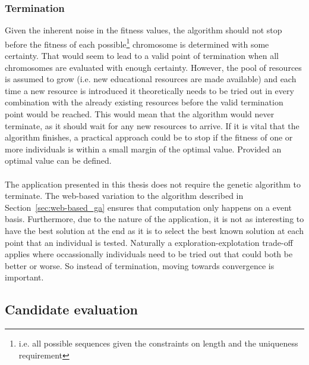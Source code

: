 \subsubsection{Termination}
\label{sec:approach_termination}
Given the inherent noise in the fitness values, the algorithm should not stop
before the fitness of each possible\footnote{i.e. all possible sequences given
the constraints on length and the uniqueness requirement} chromosome is determined
with some certainty. That would seem to lead to a valid point of termination
when all chromosomes are evaluated with enough certainty. However,
the pool of resources is assumed to grow (i.e. new educational resources are made
available) and each time a new resource is introduced it theoretically needs to be
tried out in every combination with the already existing resources before the valid
termination point would be reached. This would mean that the algorithm would
never terminate, as it should wait for any new resources to arrive. If it is vital that
the algorithm finishes, a practical approach could be to stop if the fitness of
one or more individuals is within a small margin of the optimal value. Provided
an optimal value can be defined.\\\\
\noindent
The application presented in this thesis does not require the genetic algorithm
to terminate. The web-based variation to the algorithm described in
Section~\ref{sec:web-based_ga} ensures that computation only happens on a event
basis. Furthermore, due to the nature of the application, it is not
as interesting to have the best solution at the end as it is to select the best
known solution at each point that an individual is tested. Naturally a
exploration-explotation trade-off applies where occassionally individuals need
to be tried out that could both be better or worse. So instead of termination,
moving towards convergence is important.

\subsection{Candidate evaluation}
\label{sec:approach_evaluation}
